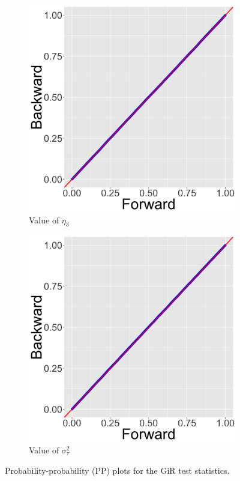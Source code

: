 \documentclass[ba]{imsart}
\numberwithin{equation}{section}
\theoremstyle{plain}
\begin{document}
\begin{figure}[!t]
\begin{subfigure}[b]{0.2425\textwidth}
   	\end{subfigure}   	   		   	   	
   	\begin{subfigure}[b]{0.2425\textwidth}
   		\caption{Value of $\eta_3$}
   		\includegraphics[width=\textwidth]{img/plot11.png}	
   	\end{subfigure}   	   		   	   	  		   	   	 	
   	\begin{subfigure}[b]{0.2425\textwidth}
   		\caption{Value of $\sigma^2_\tau$}
   		\includegraphics[width=\textwidth]{img/plot12.png}	
   	\end{subfigure}   	   		   	   	   	   		   	   	   		   	   	
   	\caption{Probability-probability (PP) plots for the GiR test statistics.}
   	\label{figure:GiRplot}
   \end{figure}   
\end{document}
